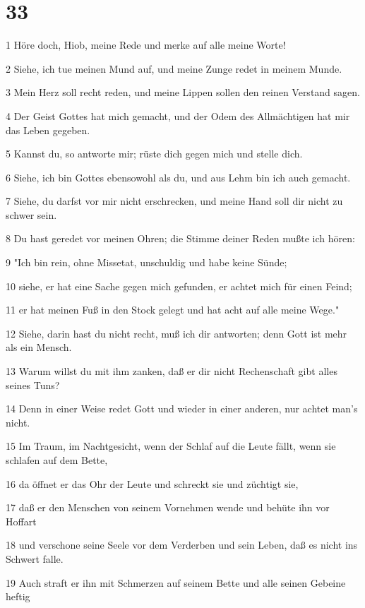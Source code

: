 \chapter{33}

\par 1 Höre doch, Hiob, meine Rede und merke auf alle meine Worte!
\par 2 Siehe, ich tue meinen Mund auf, und meine Zunge redet in meinem Munde.
\par 3 Mein Herz soll recht reden, und meine Lippen sollen den reinen Verstand sagen.
\par 4 Der Geist Gottes hat mich gemacht, und der Odem des Allmächtigen hat mir das Leben gegeben.
\par 5 Kannst du, so antworte mir; rüste dich gegen mich und stelle dich.
\par 6 Siehe, ich bin Gottes ebensowohl als du, und aus Lehm bin ich auch gemacht.
\par 7 Siehe, du darfst vor mir nicht erschrecken, und meine Hand soll dir nicht zu schwer sein.
\par 8 Du hast geredet vor meinen Ohren; die Stimme deiner Reden mußte ich hören:
\par 9 "Ich bin rein, ohne Missetat, unschuldig und habe keine Sünde;
\par 10 siehe, er hat eine Sache gegen mich gefunden, er achtet mich für einen Feind;
\par 11 er hat meinen Fuß in den Stock gelegt und hat acht auf alle meine Wege."
\par 12 Siehe, darin hast du nicht recht, muß ich dir antworten; denn Gott ist mehr als ein Mensch.
\par 13 Warum willst du mit ihm zanken, daß er dir nicht Rechenschaft gibt alles seines Tuns?
\par 14 Denn in einer Weise redet Gott und wieder in einer anderen, nur achtet man's nicht.
\par 15 Im Traum, im Nachtgesicht, wenn der Schlaf auf die Leute fällt, wenn sie schlafen auf dem Bette,
\par 16 da öffnet er das Ohr der Leute und schreckt sie und züchtigt sie,
\par 17 daß er den Menschen von seinem Vornehmen wende und behüte ihn vor Hoffart
\par 18 und verschone seine Seele vor dem Verderben und sein Leben, daß es nicht ins Schwert falle.
\par 19 Auch straft er ihn mit Schmerzen auf seinem Bette und alle seinen Gebeine heftig
